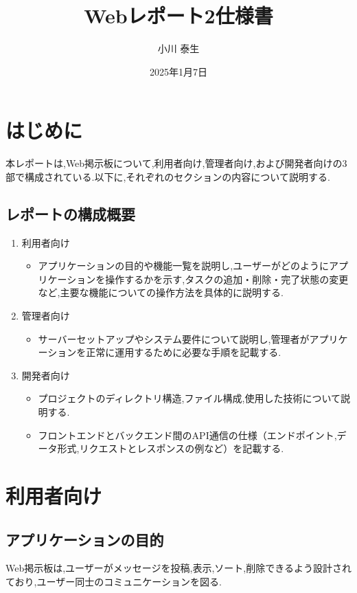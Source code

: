 \documentclass[uplatex,dvipdfmx]{jsarticle}
\title{Webレポート2仕様書}
\author{小川 泰生}
\date{2025年1月7日}
\begin{document}
\maketitle

\tableofcontents

\section{はじめに}
本レポートは,Web掲示板について,利用者向け,管理者向け,および開発者向けの3部で構成されている.以下に,それぞれのセクションの内容について説明する.

\subsection{レポートの構成概要}
\begin{enumerate}
    \item 利用者向け
    \begin{itemize}
        \item アプリケーションの目的や機能一覧を説明し,ユーザーがどのようにアプリケーションを操作するかを示す,タスクの追加・削除・完了状態の変更など,主要な機能についての操作方法を具体的に説明する.
    \end{itemize}
    \item 管理者向け
    \begin{itemize}
        \item サーバーセットアップやシステム要件について説明し,管理者がアプリケーションを正常に運用するために必要な手順を記載する.
    \end{itemize}
    \item 開発者向け
    \begin{itemize}
        \item プロジェクトのディレクトリ構造,ファイル構成,使用した技術について説明する.
        \item フロントエンドとバックエンド間のAPI通信の仕様（エンドポイント,データ形式,リクエストとレスポンスの例など）を記載する.
    \end{itemize}
\end{enumerate}

\section{利用者向け}
\subsection{アプリケーションの目的}
Web掲示板は,ユーザーがメッセージを投稿,表示,ソート,削除できるよう設計されており,ユーザー同士のコミュニケーションを図る.
\end{document}
